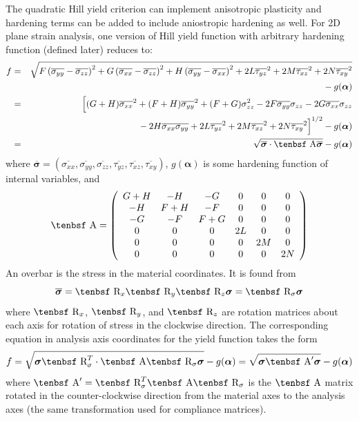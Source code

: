 \documentclass[11pt]{book}
\renewcommand{\vec}[1]{\boldsymbol{#1}}
\def\A{\hbox{\tenbsf A}}
\def\R{\hbox{\tenbsf R}}
\def\s#1{\sigma_{#1}}
\def\t#1{\tau_{#1}}
\begin{document}
The quadratic Hill yield criterion can implement anisotropic plasticity and hardening terms can be added to include aniostropic hardening as well. For 2D plane strain analysis, one version of Hill yield function with arbitrary hardening function (defined later) reduces to:
\begin{eqnarray}
          f & = & \sqrt{F\left(\overline{\s{yy}}- \overline{\s{zz}}\right)^2 + G\left(\overline{\s{xx}}- \overline{\s{zz}}\right)^2
               + H\left(\overline{\s{yy}}- \overline{\s{xx}}\right)^2 +2L\overline{\t{yz}}^2 +2M\overline{\t{xz}}^2
                 +2N\overline{\t{xy}}^2}
  \nonumber\\
 &&\qquad\mbox{}
                 - g(\vec\alpha) \\
             & = & \Bigl[(G+H)\overline{\s{xx}}^2  + (F+H)\overline{\s{yy}}^2 + (F+G)\s{zz}^2
                   -2F \overline{\s{yy}}\s{zz} - 2G \overline{\s{xx}}\s{zz}
 \nonumber\\
 &&\qquad\mbox{}
                    - 2H \overline{\s{xx}}\overline{\s{yy}}
                   +2L\overline{\t{yz}}^2 +2M\overline{\t{xz}}^2+2N\overline{\t{xy}}^2\Bigr]^{1/2}  - g(\vec\alpha) \\
             & = & \sqrt{\overline{\vec\sigma} \cdot \A \overline{\vec\sigma}} - g(\vec\alpha)       \label{froteq}
\end{eqnarray}
where $\overline{\vec\sigma} = (\overline{\s{xx}}, \overline{\s{yy}}, \overline{\s{zz}}, \overline{\t{yz}}, \overline{\t{xz}}, \overline{\t{xy}})$, $g(\vec\alpha)$ is some hardening function of internal variables, and
\begin{equation}
      \A = \left( \begin{array}{cccccc}
                       G+H & -H & -G & 0 & 0 & 0 \\
                       -H & F+H & -F & 0 & 0 & 0\\
                       -G & -F & F+G & 0 & 0 & 0\\
                        0 & 0 & 0 & 2L & 0 & 0 \\
                       0 & 0 & 0 & 0 & 2M & 0 \\
                      0 & 0 & 0 & 0 & 0 & 2N
                       \end{array} \right)
\end{equation}
An overbar is the stress in the material coordinates. It is found from
\begin{equation}
     \overline{\vec\sigma} = \R_x\R_y\R_z\vec\sigma = \R_\sigma\vec\sigma
\end{equation}
where $\R_x$, $\R_y$, and $\R_z$ are rotation matrices about each axis for rotation of stress in the clockwise direction.
The corresponding equation in analysis axis coordinates for the yield function takes the form
\begin{equation}
     f = \sqrt{\vec\sigma \R_\sigma^T\cdot \A \R_\sigma\vec\sigma} - g(\vec\alpha) = \sqrt{\vec\sigma \A' \vec\sigma} - g(\vec\alpha)     \label{fanaleq}
\end{equation}
where $\A' = \R_\sigma^T\A\R_\sigma$ is the $\A$ matrix rotated in the counter-clockwise direction from the material axes to the analysis axes (the same transformation used for compliance matrices).
\end{document}
